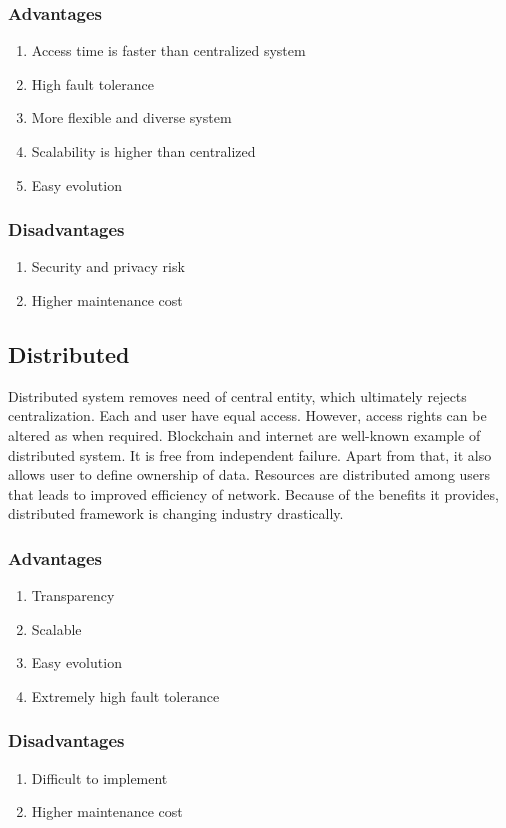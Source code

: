 \documentclass[a4paper,twoside,12pt]{report}
\begin{document}
\begin{spacing}{1.5}
\subsubsection{Advantages}
\begin{enumerate}
	\item{Access time is faster than centralized system}
	\item{High fault tolerance}
	\item{More flexible and diverse system}
	\item{Scalability is higher than centralized}
	\item{Easy evolution}
\end{enumerate}
\subsubsection{Disadvantages}
\begin{enumerate}
	\item{Security and privacy risk}
	\item{Higher maintenance cost}
\end{enumerate}
\subsection{Distributed}
Distributed system removes need of central entity, which ultimately rejects centralization. Each and user have equal access. However, access rights can be altered as when required. Blockchain and internet are well-known example of distributed system. It is free from independent failure. Apart from that, it also allows user to define ownership of data. Resources are distributed among users that leads to improved efficiency of network. Because of the benefits it provides, distributed framework is changing industry drastically.
\subsubsection{Advantages}
\begin{enumerate}
	\item{Transparency}
	\item{Scalable}
	\item{Easy evolution}
	\item{Extremely high fault tolerance}
\end{enumerate}
\subsubsection{Disadvantages}
\begin{enumerate}
	\item{Difficult to implement}
	\item{Higher maintenance cost}
\end{enumerate} 

\end{spacing}
\end{document}
